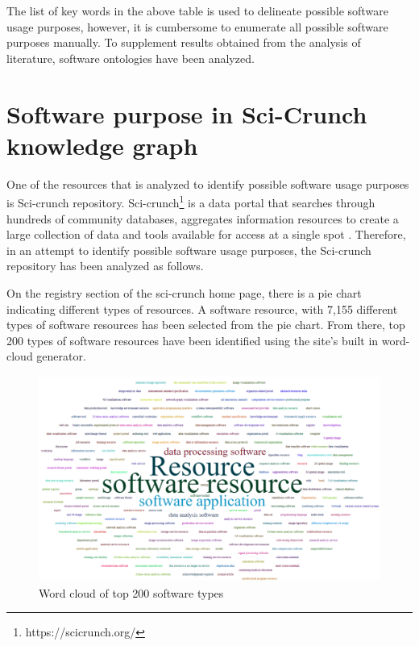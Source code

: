The list of key words in the above table is used to delineate possible software usage purposes, however, it is cumbersome to enumerate all possible software purposes manually. To supplement results obtained from the analysis of literature, software ontologies have been analyzed. 

\section{Software purpose in Sci-Crunch knowledge graph}

One of the resources that is analyzed to identify possible software usage purposes is Sci-crunch repository. Sci-crunch\footnote{https://scicrunch.org/} is a data portal that searches through hundreds of community databases, aggregates information resources to create a large collection of data and tools available for access at a single spot \citep{grethe2016scicrunch}. Therefore, in an attempt to identify possible software usage purposes, the Sci-crunch repository has been analyzed as follows. 

On the registry section of the sci-crunch home page, there is a pie chart indicating different types of resources. A software resource, with  7,155 different types of software resources has been selected from the pie chart. From there, top 200 types of software resources have been identified using the site’s built in word-cloud generator. 

\begin{figure}[htbp]
	\centering
	\includegraphics[width=1.2\textwidth]{4.graphics/figures/cloud}
	\caption{Word cloud of top 200 software types}
	\label{fig:chapter03:setup}
\end{figure}

